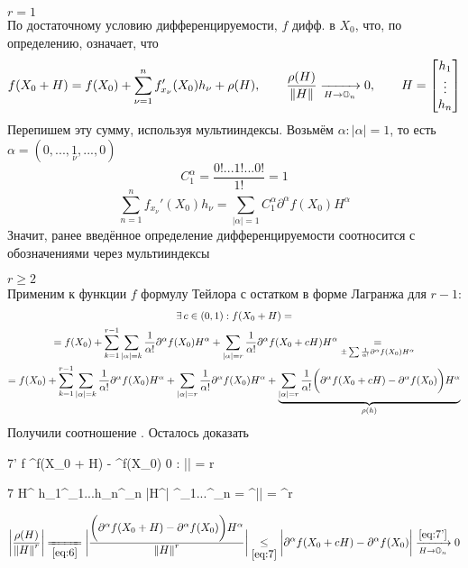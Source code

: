 \begin{iproof}
	\item $ r = 1 $ \\
	По достаточному условию дифференцируемости, $ f $ дифф. в $ X_0 $, что, по определению, означает, что
	$$ f(X_0 + H) = f(X_0) + \sum_{\nu = 1}^n f_{x_\nu}'(X_0) h_\nu + \rho(H), \qquad \frac{\rho(H)}{\left\|{H}\right\|} \xrightarrow[H \to \mathbb{O}_{n}]{} 0, \qquad H =  \begin{bmatrix} {h_1} \\ \vdots \\ {h_n} \end{bmatrix}  $$
	Перепишем эту сумму, используя мультииндексы. Возьмём $ \alpha : |\alpha| = 1 $, то есть $ \alpha = (0, ..., \underset\nu1, ..., 0) $
	$$ C_1^\alpha = \frac{0!...1!...0!}{1!} = 1 $$
	$$ \sum_{n = 1}^n f_{x_\nu}'(X_0)h_\nu = \sum_{|\alpha| = 1}C_1^\alpha \partial^\alpha f(X_0) H^\alpha $$
	Значит, ранее введённое определение дифференцируемости соотносится с обозначениями через мультииндексы
	\item $ r \ge 2 $ \\
	Применим к функции $ f $ формулу Тейлора с остатком в форме Лагранжа для $ r - 1 $:
	\begin{multline}\lbl6
		\exist c \in (0, 1) : f(X_0 + H) = \\
		= f(X_0) + \sum_{k = 1}^{r - 1} \sum_{|\alpha| = k} \frac1{\alpha!} \partial^\alpha f(X_0)H^\alpha + \sum_{|\alpha| = r} \frac1{\alpha!} \partial^\alpha f(X_0 + cH)H^\alpha \underset{\pm \sum \frac1{\alpha!} \partial^\alpha f(X_0)H^\alpha}= \\
		= f(X_0) + \sum_{k = 1}^{r - 1} \sum_{|\alpha| = k} \frac1{\alpha!} \partial^\alpha f(X_0) H^\alpha + \sum_{|\alpha| = r} \frac1{\alpha!} \partial^\alpha f(X_0) H^\alpha + \underbrace{\sum_{|\alpha| = r} \frac1{\alpha!} \bigg( \partial^\alpha f(X_0 + cH) - \partial^\alpha f(X_0) \bigg)H^\alpha}_{\rho(h)}
	\end{multline}
	Получили соотношение . Осталось доказать 
	\begin{equ}{7'}
		f \in \Cont[r]\omega {} \partial^\alpha f(X_0 + H) - \partial^\alpha f(X_0)  0 \qquad \forall \alpha : |\alpha| = r
	\end{equ}
	\begin{equ}7
		H^\alpha {} h_1^{\alpha_1}...h_n^{\alpha_n} \implies |H^\alpha| \le {}^{\alpha_1}...^{\alpha_n} = ^{|\alpha|} = ^r \implies {} 
	\end{equ}
	$$ \bigg| \frac{\rho(H)}{\norm{H}^r} \bigg| \undereq{\eref6} \bigg| \frac{\bigg( \partial^\alpha f(X_0 + H) - \partial^\alpha f(X_0) \bigg)H^\alpha}{\norm{H}^r} \bigg| \underset{\eref7}\le \bigg| \partial^\alpha f(X_0 + cH) - \partial^\alpha f(X_0) \bigg| \xrightarrow[H \to \On]{\eref{7'}} 0 $$
\end{iproof}

